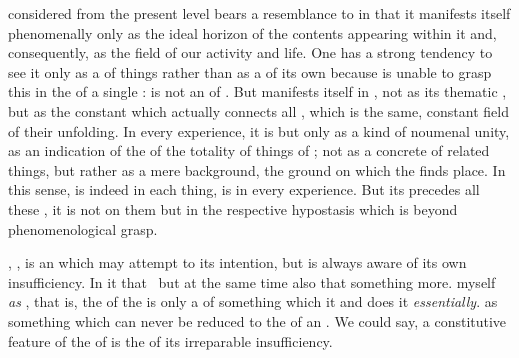  considered from the present level bears a
resemblance to  in that it manifests itself
phenomenally only as the ideal horizon of the contents appearing
within it and, consequently, as the field of our activity and
life.  One has a strong tendency to see it only as a  of
things rather than as a  of its own because  is unable to grasp this  in the  of a
single :  is not an  of .  But  manifests itself in , not as its thematic , but as the constant
 which actually connects all , which is
the same, constant field of their unfolding.  In every experience, it
is  but only as a kind of noumenal unity, as an
indication of the  of the totality of things of
; not as a concrete  of related things,
but rather as a mere background, the ground on which the  finds place.  In this sense, 
 is indeed in each thing, is  in
every experience. 
%
But its  precedes all
these , it is not  on them but in the
respective hypostasis which is beyond phenomenological grasp.


\label{sec:I}

\pa\label{lev:I} %
,  , is an  which may
attempt to  its intention, but is always aware of its
own insufficiency.  In it   that  \herenow\ but at
the same time also that  something more.  myself {\em
  as} , that is, the  of the  is only a
 of something which  it and does it {\em essentially}.
 as something which can never be reduced to the
 of an . We could say, a constitutive feature of the
 of  is the  of its irreparable
insufficiency.

